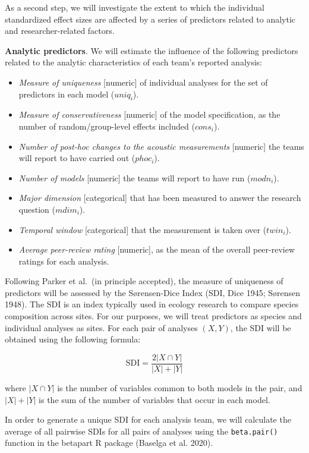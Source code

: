\documentclass[
  12pt,
]{article}
\providecommand{\tightlist}{%
  \setlength{\itemsep}{0pt}\setlength{\parskip}{0pt}}
\begin{document}
As a second step, we will investigate the extent to which the individual standardized effect sizes are affected by a series of predictors related to analytic and researcher-related factors.

\textbf{Analytic predictors}. We will estimate the influence of the following predictors related to the analytic characteristics of each team's reported analysis:

\begin{itemize}
\tightlist
\item
  \emph{Measure of uniqueness} {[}numeric{]} of individual analyses for the set of predictors in each model (\(uniq_i\)).
\item
  \emph{Measure of conservativeness} {[}numeric{]} of the model specification, as the number of random/group-level effects included (\(cons_i\)).
\item
  \emph{Number of post-hoc changes to the acoustic measurements} {[}numeric{]} the teams will report to have carried out (\(phoc_i\)).
\item
  \emph{Number of models} {[}numeric{]} the teams will report to have run (\(modn_i\)).
\item
  \emph{Major dimension} {[}categorical{]} that has been measured to answer the research question (\(mdim_i\)).
\item
  \emph{Temporal window} {[}categorical{]} that the measurement is taken over (\(twin_i\)).
\item
  \emph{Average peer-review rating} {[}numeric{]}, as the mean of the overall peer-review ratings for each analysis.
\end{itemize}

Following Parker et al.~(in principle accepted), the measure of uniqueness of predictors will be assessed by the Sørensen-Dice Index (SDI, Dice 1945; Sørensen 1948).
The SDI is an index typically used in ecology research to compare species composition across sites.
For our purposes, we will treat predictors as species and individual analyses as sites.
For each pair of analyses \((X, Y)\), the SDI will be obtained using the following formula:

\[\text{SDI} = \frac{2|X \cap Y|}{|X|+|Y|}\]

where \(|X \cap Y|\) is the number of variables common to both models in the pair, and \(|X|+|Y|\) is the sum of the number of variables that occur in each model.

In order to generate a unique SDI for each analysis team, we will calculate the average of all pairwise SDIs for all pairs of analyses using the \texttt{beta.pair()} function in the betapart R package (Baselga et al. 2020).
\end{document}

